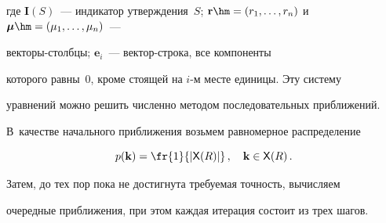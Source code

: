     где $\mathbf{I}(S)$~--- индикатор утверждения~$S$; $\mathbf{r}\hm= (r_1, 


\ldots , r_n)$ и~$\boldsymbol{\mu} \hm= (\mu_1, \ldots, \mu_n)$~---  


век\-то\-ры-столб\-цы; $\mathbf{e}_i$~--- век\-тор-стро\-ка, все компоненты 


которого равны~0, кроме стоящей на $i$-м месте единицы. Эту систему 


уравнений можно решить численно методом последовательных приближений. 


В~качестве начального приближения возьмем равномерное распределение


$$


p(\mathbf{k}) =\fr{1}{\vert {\sf X}(R)\vert} \,, \quad \mathbf{k}\in {\sf X} (R)\,.


$$





  Затем, до тех пор пока не достигнута требуемая точность, вычисляем 


очередные приближения, при этом каждая итерация состоит из трех шагов.


